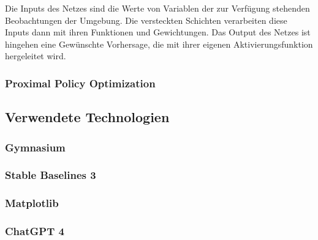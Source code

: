 Die Inputs des Netzes sind die Werte von Variablen der zur Verfügung stehenden Beobachtungen der Umgebung. Die versteckten Schichten verarbeiten diese Inputs dann mit ihren Funktionen und Gewichtungen. Das Output des Netzes ist hingehen eine Gewünschte Vorhersage, die mit ihrer eigenen Aktivierungsfunktion hergeleitet wird.
\subsubsection{Proximal Policy Optimization}
\subsection{Verwendete Technologien}
\subsubsection{Gymnasium}
\subsubsection{Stable Baselines 3}
\subsubsection{Matplotlib}
\subsubsection{ChatGPT 4}